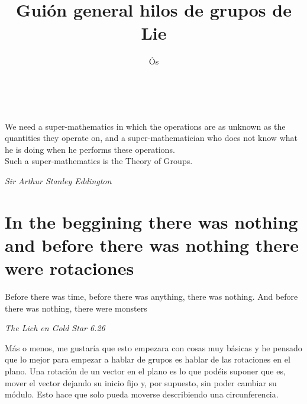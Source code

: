 \documentclass[12pt]{article}
\title{Guión general hilos de grupos de Lie}
\author{Ós }
\date{\ }
\begin{document}
\maketitle
\begin{center}
    We need a super-mathematics in which the operations are as unknown as the quantities they operate on, and a super-mathematician who does not know what he is doing when he performs these operations. \\ Such a super-mathematics is the Theory of Groups.  
\end{center}
\begin{center}
     \textit{Sir Arthur Stanley Eddington}
\end{center}

\section{In the beggining there was nothing and before there was nothing there were rotaciones}
\epigraph{Before there was time, before there was anything, there was nothing. And before there was nothing, there were monsters }{\textit{The Lich en Gold Star 6.26}}
Más o menos, me gustaría que esto empezara con cosas muy básicas y he pensado que lo mejor para empezar a hablar de grupos es hablar de las rotaciones en el plano. Una rotación de un vector en el plano es lo que podéis suponer que es, mover el vector dejando su inicio fijo y, por supuesto, sin poder cambiar su módulo. Esto hace que solo pueda moverse describiendo una circunferencia. 
\end{document}
